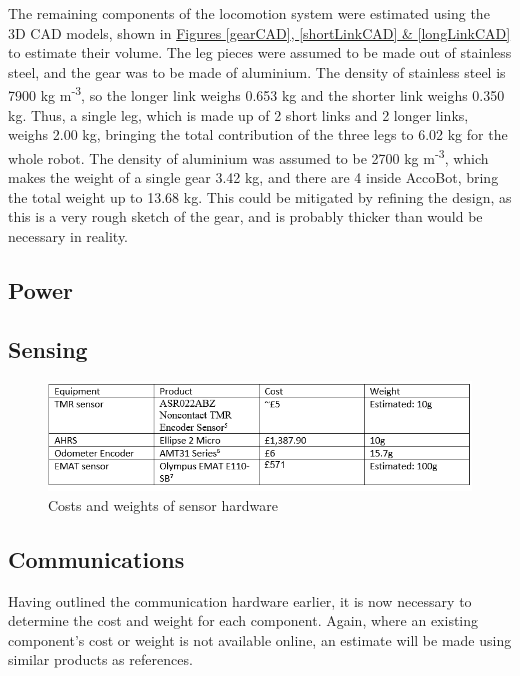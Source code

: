 \documentclass[11pt]{article}		%
\newcommand{\supercite}[1]{\textsuperscript{\cite{#1}}}		%
\begin{document}
			The remaining components of the locomotion system were estimated using the 3D CAD models, shown in \hyperref[gearCAD]{Figures \ref*{gearCAD}, \ref*{shortLinkCAD} \& \ref*{longLinkCAD}} to estimate their volume.
			The leg pieces were assumed to be made out of stainless steel, and the gear was to be made of aluminium.
			The density of stainless steel is 7900 kg m\textsuperscript{-3}\supercite{HLT}, so the longer link weighs 0.653 kg and the shorter link weighs 0.350 kg.
			Thus, a single leg, which is made up of 2 short links and 2 longer links, weighs 2.00 kg, bringing the total contribution of the three legs to 6.02 kg for the whole robot.
			The density of aluminium was assumed to be 2700 kg m\textsuperscript{-3}\supercite{HLT}, which makes the weight of a single gear 3.42 kg, and there are 4 inside AccoBot, bring the total weight up to 13.68 kg.
			This could be mitigated by refining the design, as this is a very rough sketch of the gear, and is probably thicker than would be necessary in reality.
		
		\subsection{Power}
		
		\subsection{Sensing}
		
	  		\begin{figure}[h]
				\centering
				\includegraphics[scale=1]{sensor hardware.PNG}
				\caption{Costs and weights of sensor hardware}
				\label{forecast}
			\end{figure}
			
		\subsection{Communications}
			Having outlined the communication hardware earlier, it is now necessary to determine the cost and weight for each component. Again, where an existing component’s cost or weight is not available online, an estimate will be made using similar products as references. 
			
\end{document}
